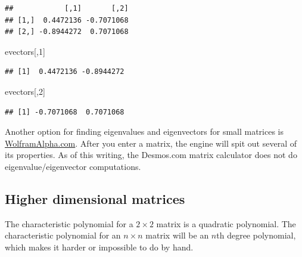 \documentclass[
]{book}
\newenvironment{Shaded}{\begin{snugshade}}{\end{snugshade}}
\newcommand{\DecValTok}[1]{\textcolor[rgb]{0.00,0.00,0.81}{#1}}
\newcommand{\NormalTok}[1]{#1}
\theoremstyle{definition}
\theoremstyle{definition}
\theoremstyle{definition}
\theoremstyle{definition}
\theoremstyle{remark}
\begin{document}
\begin{verbatim}
##            [,1]       [,2]
## [1,]  0.4472136 -0.7071068
## [2,] -0.8944272  0.7071068
\end{verbatim}

\begin{Shaded}
\begin{Highlighting}[]
\NormalTok{evectors[,}\DecValTok{1}\NormalTok{]}
\end{Highlighting}
\end{Shaded}

\begin{verbatim}
## [1]  0.4472136 -0.8944272
\end{verbatim}

\begin{Shaded}
\begin{Highlighting}[]
\NormalTok{evectors[,}\DecValTok{2}\NormalTok{]}
\end{Highlighting}
\end{Shaded}

\begin{verbatim}
## [1] -0.7071068  0.7071068
\end{verbatim}

Another option for finding eigenvalues and eigenvectors for small matrices is \href{https://www.wolframalpha.com/}{WolframAlpha.com}. After you enter a matrix, the engine will spit out several of its properties. As of this writing, the Desmos.com matrix calculator does not do eigenvalue/eigenvector computations.

\subsection*{Higher dimensional matrices}\label{higher-dimensional-matrices}

The characteristic polynomial for a \(2\times 2\) matrix is a quadratic polynomial. The characteristic polynomial for an \(n\times n\) matrix will be an \(n\)th degree polynomial, which makes it harder or impossible to do by hand.
\end{document}
